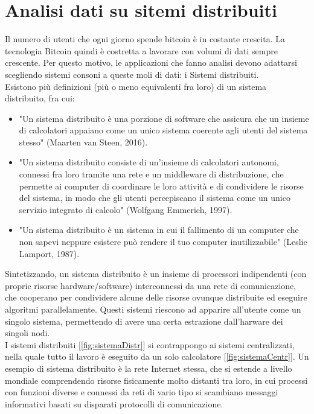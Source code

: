 \section{Analisi dati su sitemi distribuiti}
\label{sec:analisi dati su sistemi distribuiti}
Il numero di utenti che ogni giorno spende bitcoin è in costante crescita. La tecnologia Bitcoin quindi è costretta a lavorare con volumi di dati sempre crescente. Per questo motivo, le applicazioni che fanno analisi devono adattarsi scegliendo sistemi consoni a queste moli di dati: i Sistemi distribuiti.
\\Esistono più definizioni (più o meno equivalenti fra loro) di un sistema distribuito, fra cui:
\begin{itemize}
\item  "Un sistema distribuito è una porzione di software che assicura che un insieme di calcolatori appaiano come un unico sistema coerente agli utenti del sistema stesso" (Maarten van Steen, 2016).\cite{sitema-distribuito-1}
\item "Un sistema distribuito consiste di un'insieme di calcolatori autonomi, connessi fra loro tramite una rete e un middleware di distribuzione, che permette ai computer di coordinare le loro attività e di condividere le risorse del sistema, in modo che gli utenti percepiscano il sistema come un unico servizio integrato di calcolo" (Wolfgang Emmerich, 1997).\cite{sitema-distribuito-2}
\item "Un sistema distribuito è un sistema in cui il fallimento di un computer che non sapevi neppure esistere può rendere il tuo computer inutilizzabile" (Leslie Lamport, 1987).\cite{sitema-distribuito-3}
\end{itemize}
Sintetizzando, un sistema distribuito è un insieme di processori indipendenti (con proprie risorse hardware/software) interconnessi da una rete di comunicazione, che cooperano per condividere alcune delle risorse ovunque distribuite ed eseguire algoritmi parallelamente. Questi sistemi riescono ad apparire all'utente come un singolo sistema, permettendo di avere una certa estrazione dall'harware dei singoli nodi.
\\I sistemi distribuiti [\ref{fig:sistemaDistr}] si contrappongo ai sistemi centralizzati, nella quale tutto il lavoro è eseguito da un solo calcolatore [\ref{fig:sistemaCentr}]. Un esempio di sistema distribuito è la rete Internet stessa, che si estende a livello mondiale comprendendo risorse fisicamente molto distanti tra loro, in cui processi con funzioni diverse e connessi da reti di vario tipo si scambiano messaggi informativi basati su disparati protocolli di comunicazione.

